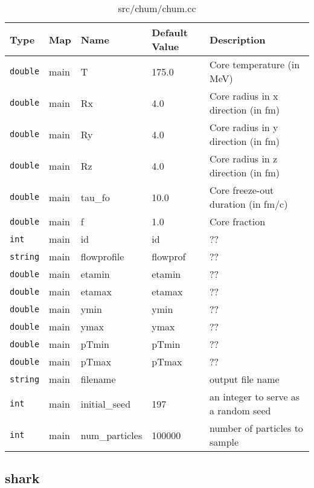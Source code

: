 \documentclass[10pt]{article}
\begin{document}
{        \begin{table}
            \begin{tabular}{lllll}
                \hline\hline
                Type & Map & Name & Default Value & Description \\
                \hline\hline 
                {\tt double} & main & T & 175.0 & Core temperature (in MeV)\\\hline
                {\tt double} & main & Rx & 4.0 & Core radius in x direction (in fm)\\\hline
                {\tt double} & main & Ry & 4.0 & Core radius in y direction (in fm)\\\hline
                {\tt double} & main & Rz & 4.0 & Core radius in z direction (in fm)\\\hline
                {\tt double} & main & tau\_fo & 10.0 & Core freeze-out duration (in fm/c)\\\hline
                {\tt double} & main & f & 1.0 & Core fraction\\\hline
                {\tt int} & main & id & id & ??\\\hline
                {\tt string} & main & flowprofile & flowprof & ??\\\hline
                {\tt double} & main & etamin & etamin & ??\\\hline
                {\tt double} & main & etamax & etamax & ??\\\hline
                {\tt double} & main & ymin & ymin & ??\\\hline
                {\tt double} & main & ymax & ymax & ??\\\hline
                {\tt double} & main & pTmin & pTmin & ??\\\hline
                {\tt double} & main & pTmax & pTmax & ??\\\hline
                {\tt string} & main & filename &  & output file name\\\hline
                {\tt int} & main & initial\_seed & 197 & an integer to serve as a random seed\\\hline
                {\tt int} & main & num\_particles & 100000 & number of particles to sample\\\hline
            \end{tabular}
            \caption{ src/chum/chum.cc }
        \end{table}


\subsection{shark}

}
\end{document}

